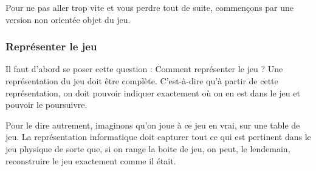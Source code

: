 		Pour ne pas aller trop vite et vous perdre tout de suite,
		commençons par une version non orientée objet du jeu.
		
		\subsubsection*{Représenter le jeu}

			Il faut d'abord se poser cette question :
			Comment représenter le jeu ?
			Une représentation du jeu doit être complète.
			C'est-à-dire qu'à partir de cette représentation,
			on doit pouvoir indiquer exactement où on en est dans le jeu
			et pouvoir le poursuivre.
			
			Pour le dire autrement, 
			imaginons qu'on joue à ce jeu \og{}en vrai\fg{}, sur une table de jeu.
			La représentation informatique doit capturer tout ce qui est pertinent
			dans le jeu physique de sorte que, si on range la boite de jeu,
			on peut, le lendemain, reconstruire le jeu exactement comme il était.
			
